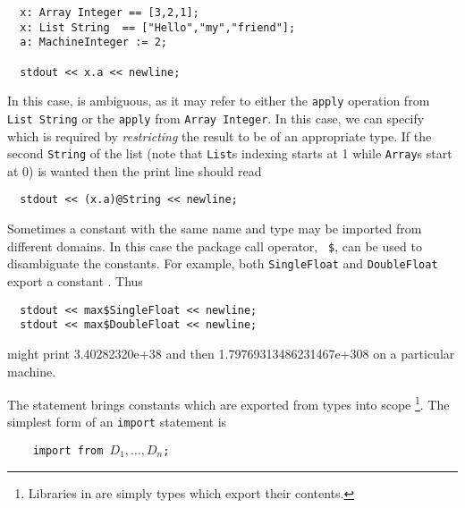 \begin{small}
\begin{verbatim}
  x: Array Integer == [3,2,1];
  x: List String  == ["Hello","my","friend"];
  a: MachineInteger := 2;

  stdout << x.a << newline;
\end{verbatim}
\end{small}

In this case,  is ambiguous, as it may refer to either the
{\tt apply} operation from {\tt List~String} or the {\tt apply} from
{\tt Array~Integer}.  In this case, we can specify which is required by {\em
restricting} the%
%
%
result to be of an appropriate type. If the second {\tt String} of
the list (note that {\tt List}s indexing starts at 1 while {\tt Array}s start
at 0) is wanted then the print line should read

\begin{small}
\begin{verbatim}
  stdout << (x.a)@String << newline;
\end{verbatim}
\end{small}

Sometimes a constant with the same name and type may be imported
from different domains. In this case the package call operator, {\tt
\$}, can be used to disambiguate the constants. For example, both
{\tt SingleFloat} and {\tt DoubleFloat} export a constant .
Thus
\begin{small}
\begin{verbatim}
  stdout << max$SingleFloat << newline;
  stdout << max$DoubleFloat << newline;
\end{verbatim}
\end{small}

might print 3.40282320e+38 and then 1.79769313486231467e+308 on a particular
machine.


The  statement brings constants which are exported from
types into scope%
\footnote{Libraries in \asharp{} are simply types which export their
 contents.}.
The simplest form of an {\tt import} statement is

\verb^    ^{\tt import from $D_1, \ldots, D_n$;}

